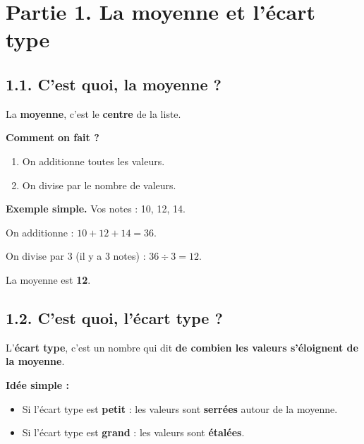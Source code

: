 \documentclass[12pt,a4paper]{article}
\begin{document}
\vspace{0.5cm}

\section*{Partie 1. La moyenne et l'écart type}

\subsection*{1.1. C'est quoi, la moyenne ?}

\begin{rappel}
La \textbf{moyenne}, c'est le \textbf{centre} de la liste.

\vspace{0.2cm}
\textbf{Comment on fait ?}

\vspace{0.2cm}
\begin{enumerate}[leftmargin=*]
  \item On additionne toutes les valeurs.
  \item On divise par le nombre de valeurs.
\end{enumerate}
\end{rappel}

\begin{enclair}
\textbf{Exemple simple.} Vos notes : 10, 12, 14.

On additionne : $10 + 12 + 14 = 36$.

On divise par 3 (il y a 3 notes) : $36 \div 3 = 12$.

La moyenne est \textbf{12}.
\end{enclair}

\subsection*{1.2. C'est quoi, l'écart type ?}

\begin{rappel}
L'\textbf{écart type}, c'est un nombre qui dit \textbf{de combien les valeurs s'éloignent de la moyenne}.

\vspace{0.2cm}
\textbf{Idée simple :}
\begin{itemize}[leftmargin=*]
  \item Si l'écart type est \textbf{petit} : les valeurs sont \textbf{serrées} autour de la moyenne.
  \item Si l'écart type est \textbf{grand} : les valeurs sont \textbf{étalées}.
\end{itemize}
\end{rappel}
\end{document}

